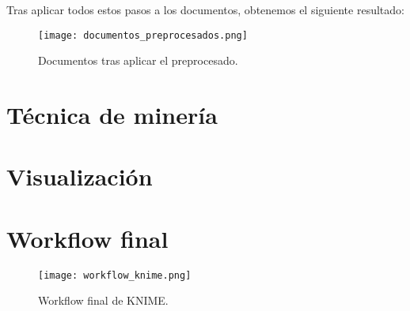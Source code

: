 Tras aplicar todos estos pasos a los documentos, obtenemos el siguiente resultado:

\begin{figure}[H]
	\centering
	\texttt{[image: documentos\_preprocesados.png]}
	\caption{Documentos tras aplicar el preprocesado.}
	\label{fig:documentos_preprocesados}
\end{figure}


\section{Técnica de minería}

\section{Visualización}


\section{Workflow final}

\begin{figure}[H]
	\centering
	\texttt{[image: workflow\_knime.png]}
	\caption{Workflow final de KNIME.}
	\label{fig:workflow_knime}
\end{figure}
